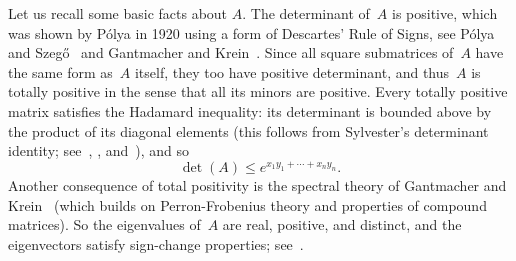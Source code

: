 \documentclass[12pt]{article}
\begin{document}
Let us recall some basic facts about $A$.
The determinant of~$A$ is positive, which was shown by
P\'{o}lya in 1920 using a form of Descartes' Rule of Signs,
see P\'{o}lya and Szeg\H{o}~\cite[Part Five, Problem 76]{Polya:1976}
and Gantmacher and Krein~\cite{Gantmakher:1937}.
Since all square submatrices of~$A$ have the same form as~$A$
itself, they too have positive determinant, and thus~$A$
is totally positive in the sense that all its minors are positive.
Every totally positive matrix satisfies the Hadamard inequality:
its determinant is bounded above by the product of its diagonal elements
(this follows from Sylvester's determinant identity;
see~\cite[Th{\'e}or{\`e}me 1]{Gantmakher:1937},
\cite[Section 1.4]{Pinkus:2009},
and~\cite[Chapter 6]{FallatJohnson:2011}), and so
$$ \det(A) \le e^{x_1 y_1 + \cdots + x_n y_n}. $$
Another consequence of total positivity is the
spectral theory of Gantmacher and Krein~\cite{Gantmakher:1937}
(which builds on Perron-Frobenius theory and properties of compound matrices).
So the eigenvalues of~$A$ are real, positive, and distinct, and
the eigenvectors satisfy sign-change properties;
see~\cite[Theorem 5.3]{Pinkus:2009}.
\end{document}
